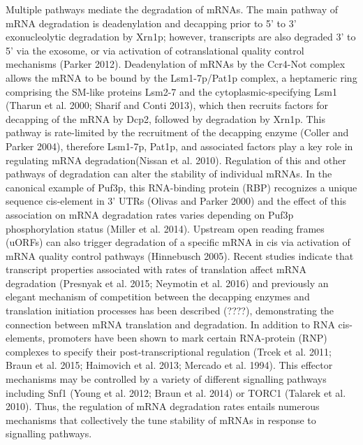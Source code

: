 Multiple pathways mediate the degradation of
mRNAs. The main pathway of mRNA degradation is deadenylation and
decapping prior to 5’ to 3’ exonucleolytic degradation by Xrn1p;
however, transcripts are also degraded 3’ to 5’ via the exosome, or
via activation of cotranslational quality control mechanisms (Parker
2012). Deadenylation of mRNAs by the Ccr4-Not complex allows the mRNA
to be bound by the Lsm1-7p/Pat1p complex, a heptameric ring comprising
the SM-like proteins Lsm2-7 and the cytoplasmic-specifying Lsm1
(Tharun et al. 2000; Sharif and Conti 2013), which then recruits
factors for decapping of the mRNA by Dcp2, followed by degradation by
Xrn1p. This pathway is rate-limited by the recruitment of the
decapping enzyme (Coller and Parker 2004), therefore Lsm1-7p, Pat1p,
and associated factors play a key role in regulating mRNA
degradation(Nissan et al. 2010). Regulation of this and other pathways
of degradation can alter the stability of individual mRNAs. In the
canonical example of Puf3p, this RNA-binding protein (RBP) recognizes
a unique sequence cis-element in 3’ UTRs (Olivas and Parker 2000) and
the effect of this association on mRNA degradation rates varies
depending on Puf3p phosphorylation status (Miller et al. 2014).
Upstream open reading frames (uORFs) can also trigger degradation of a
specific mRNA in cis via activation of mRNA quality control pathways
(Hinnebusch 2005). Recent studies indicate that transcript properties
associated with rates of translation affect mRNA degradation (Presnyak
et al. 2015; Neymotin et al. 2016) and previously an elegant mechanism
of competition between the decapping enzymes and translation
initiation processes has been described (????), demonstrating the
connection between mRNA translation and degradation. In addition to
RNA cis-elements, promoters have been shown to mark certain
RNA-protein (RNP) complexes to specify their post-transcriptional
regulation (Trcek et al. 2011; Braun et al. 2015; Haimovich et al.
2013; Mercado et al. 1994). This effector mechanisms may be controlled
by a variety of different signalling pathways including Snf1 (Young et
al. 2012; Braun et al. 2014) or TORC1 (Talarek et al. 2010). Thus, the
regulation of mRNA degradation rates entails numerous mechanisms that
collectively the tune stability of mRNAs in response to signalling
pathways.  

